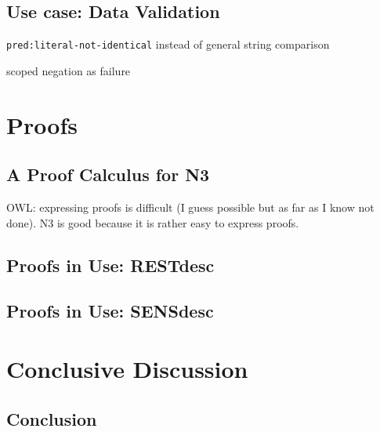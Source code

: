 \documentclass[11pt,a4paper,twoside]{book}
\theoremstyle{remark}
\begin{document}
\chapter{Use case: Data Validation}\label{validation}

\texttt{pred:literal-not-identical} instead of general string comparison



scoped negation as failure
\part{Proofs}\label{proof}

\chapter{A Proof Calculus for N3}\label{cal}
OWL: expressing proofs is difficult (I guess possible but as far as I know not done). N3 is good because it is rather  easy to express proofs.
%
%
\chapter{Proofs in Use: RESTdesc}\label{restdesc}
\chapter{Proofs in Use: SENSdesc}\label{sensdesc}




\part{Conclusive Discussion}\label{conclusion}
\chapter{Conclusion}\label{concl}
\end{document}
